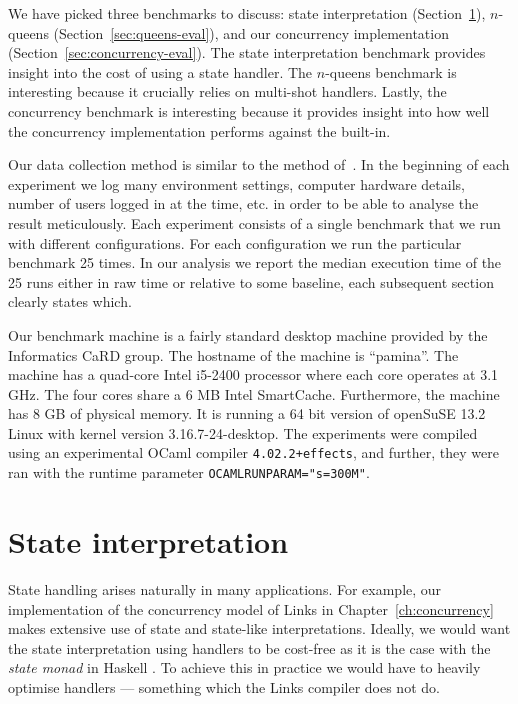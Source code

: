 \documentclass[12pt,mscres,cdtppar,twoside,openright,logo,rightchapter,normalheadings]{infthesis}
\theoremstyle{definition}
\begin{document}
We have picked three benchmarks to discuss: state interpretation
(Section~\ref{sec:state-eval}), $n$-queens
(Section~\ref{sec:queens-eval}), and our concurrency implementation
(Section~\ref{sec:concurrency-eval}). The state interpretation
benchmark provides insight into the cost of using a state handler. The
$n$-queens benchmark is interesting because it crucially relies on
multi-shot handlers. Lastly, the concurrency benchmark is interesting
because it provides insight into how well the concurrency
implementation performs against the built-in.

Our data collection method is similar to the method
of~\cite{Harris2016}. In the beginning of each experiment we log many
environment settings, computer hardware details, number of users
logged in at the time, etc. in order to be able to analyse the result
meticulously. Each experiment consists of a single benchmark that we
run with different configurations. For each configuration we run the
particular benchmark 25 times. In our analysis we report the median
execution time of the 25 runs either in raw time or relative to some
baseline, each subsequent section clearly states which.

Our benchmark machine is a fairly standard desktop machine provided by
the Informatics CaRD group. The hostname of the machine is
``pamina''. The machine has a quad-core Intel i5-2400 processor where
each core operates at 3.1 GHz. The four cores share a 6 MB Intel
SmartCache. Furthermore, the machine has 8 GB of physical memory. It
is running a 64 bit version of openSuSE 13.2 Linux with kernel version
3.16.7-24-desktop. The experiments were compiled using an experimental
OCaml compiler \texttt{4.02.2+effects}, and further, they were ran
with the runtime parameter \texttt{OCAMLRUNPARAM="s=300M"}.
%

\section{State interpretation}
\label{sec:state-eval}

State handling arises naturally in many applications. For example, our
implementation of the concurrency model of Links in
Chapter~\ref{ch:concurrency} makes extensive use of state and
state-like interpretations. Ideally, we would want the state
interpretation using handlers to be cost-free as it is the case with
the \emph{state monad} in Haskell \citep{Kammar2013}. To achieve this
in practice we would have to heavily optimise handlers --- something
which the Links compiler does not do.
\end{document}
